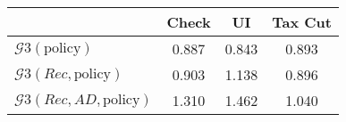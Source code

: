 \begin{tabular}{@{}lccc@{}}
\toprule
                          & Check      & UI    & Tax Cut    \\  \midrule
$\mathcal{G}3(\text{policy})$ & 0.887  & 0.843  & 0.893     \\
$\mathcal{G}3(Rec,\text{policy})$ & 0.903  & 1.138  & 0.896     \\
$\mathcal{G}3(Rec, AD,\text{policy})$ & 1.310  & 1.462  & 1.040     \\
\end{tabular}
